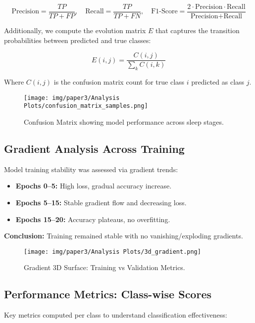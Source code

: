 \[
\text{Precision} = \frac{TP}{TP + FP}, \quad
\text{Recall} = \frac{TP}{TP + FN}, \quad
\text{F1-Score} = \frac{2 \cdot \text{Precision} \cdot \text{Recall}}{\text{Precision} + \text{Recall}}
\]

Additionally, we compute the evolution matrix \( E \) that captures the transition probabilities between predicted and true classes:

\[
E(i, j) = \frac{C(i, j)}{\sum_{k} C(i, k)}
\]

Where \( C(i, j) \) is the confusion matrix count for true class \( i \) predicted as class \( j \).

\begin{figure}[H]
	\centering
	\texttt{[image: img/paper3/Analysis Plots/confusion\_matrix\_samples.png]}
	\caption{Confusion Matrix showing model performance across sleep stages.}
\end{figure}

\subsection{Gradient Analysis Across Training}

Model training stability was assessed via gradient trends:

\begin{itemize}
	\item \textbf{Epochs 0–5:} High loss, gradual accuracy increase.
	\item \textbf{Epochs 5–15:} Stable gradient flow and decreasing loss.
	\item \textbf{Epochs 15–20:} Accuracy plateaus, no overfitting.
\end{itemize}

\textbf{Conclusion:} Training remained stable with no vanishing/exploding gradients.

\begin{figure}[H]
	\centering
	\texttt{[image: img/paper3/Analysis Plots/3d\_gradient.png]}
	\caption{Gradient 3D Surface: Training vs Validation Metrics.}
\end{figure}

\subsection{Performance Metrics: Class-wise Scores}

Key metrics computed per class to understand classification effectiveness:

